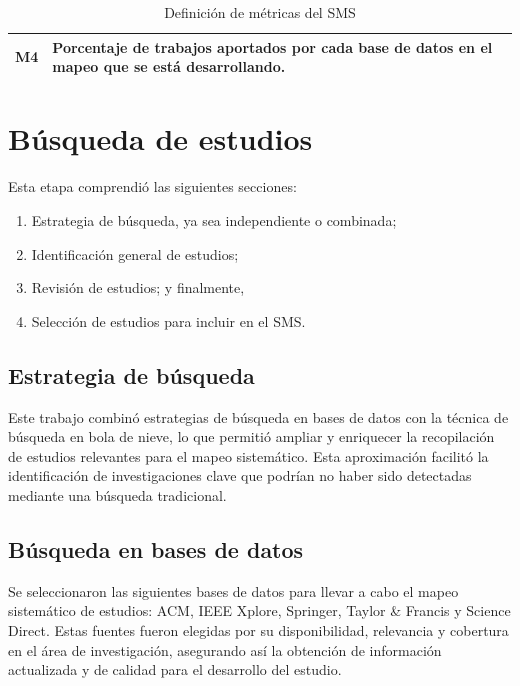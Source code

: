 \begin{table}[H]
\begin{tabular}{|c|p{13cm}|}
		M4               & Porcentaje de trabajos aportados por cada base de datos en el mapeo que se está desarrollando.                                                                                                                                                                                                                                                                                                                                                                                                                 \\ \hline
	\end{tabular}
	\caption{Definición de métricas del SMS}
	\label{tab:metricas}
\end{table}


\newpage \section{Búsqueda de estudios}


Esta etapa comprendió las siguientes secciones:
\begin{enumerate}
	\item Estrategia de búsqueda, ya sea independiente o combinada;
	\item Identificación general de estudios;
	\item Revisión de estudios; y finalmente,
	\item Selección de estudios para incluir en el SMS.\@
\end{enumerate}

\subsection{Estrategia de búsqueda}

Este trabajo combinó estrategias de búsqueda en bases de datos con la técnica de búsqueda en bola de nieve, lo que permitió ampliar y enriquecer la recopilación de estudios relevantes para el mapeo sistemático. Esta aproximación facilitó la identificación de investigaciones clave que podrían no haber sido detectadas mediante una búsqueda tradicional.

\subsection{Búsqueda en bases de datos}\label{subsec:busquedaBasesDatos}
Se seleccionaron las siguientes bases de datos para llevar a cabo el mapeo sistemático de estudios: ACM, IEEE Xplore, Springer, Taylor \& Francis y Science Direct. Estas fuentes fueron elegidas por su disponibilidad, relevancia y cobertura en el área de investigación, asegurando así la obtención de información actualizada y de calidad para el desarrollo del estudio.


